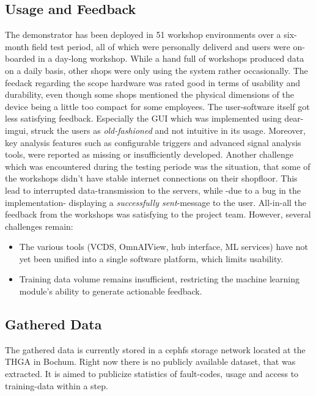 \documentclass[conference,a4paper]{IEEEtran}
\begin{document}
\subsection{Usage and Feedback}
The demonstrator has been deployed in 51 workshop environments over a six-month field test period, 
all of which were personally deliverd and users were on-boarded in a day-long workshop.
While a hand full of workshops produced data on a daily basis, other shops were only using the system rather occasionally. 
The feedack regarding the scope hardware was rated good in terms of usability and durability, even though some shops mentioned the physical dimensions of the device being a little too compact for some employees.
The user-software itself got less satisfying feedback. 
Especially the GUI which was implemented using dear-imgui, struck the users as \textit{old-fashioned} and not intuitive in its usage.
Moreover, key analysis features such as configurable triggers and advanced signal analysis tools, were reported as missing or insufficiently developed.
Another challenge which was encountered during the testing periode was the situation, that some of the workshops didn't have stable internet connections on their shopfloor.
This lead to interrupted data-transmission to the servers, while -due to a bug in the implementation- displaying a \textit{successfully sent}-message to the user.
All-in-all the feedback from the workshops was satisfying to the project team.
However, several challenges remain:
\begin{itemize}
  \item The various tools (VCDS, OmnAIView, hub interface, ML services) have not yet been unified into a single software platform, which limits usability.
  \item Training data volume remains insufficient, restricting the machine learning module’s ability to generate actionable feedback.
\end{itemize}

\subsection{Gathered Data}
The gathered data is currently stored in a cephfs storage network located at the THGA in Bochum.
Right now there is no publicly available dataset, that was extracted.
It is aimed to publicize statistics of fault-codes, usage and access to training-data within a step. 

\end{document}
